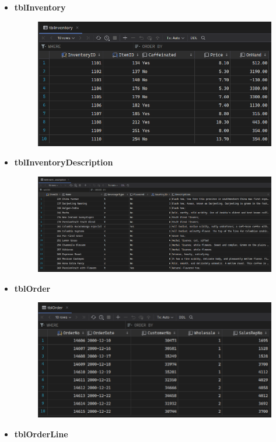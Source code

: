 \documentclass[12pt,titlepage]{article}
\begin{document}
\begin{itemize}
{\begin{figure}[h]
        \end{figure}
    }
    \item {
        \textbf{tblInventory}
        \begin{figure}[h]
            \centering
            \includegraphics[width=.7\textwidth]{./images/tblInventory.png}
        \end{figure}
    }
    \pagebreak
    \item {
        \textbf{tblInventoryDescription}
        \begin{figure}[h]
            \centering
            \includegraphics[width=.7\textwidth]{./images/tblInventoryDescription.png}
        \end{figure}
    }
    \item {
        \textbf{tblOrder}
        \begin{figure}[h]
            \centering
            \includegraphics[width=.7\textwidth]{./images/tblOrder.png}
        \end{figure}
    }
    \pagebreak
    \item {
        \textbf{tblOrderLine}
        \begin{figure}[h]
            \centering

\end{figure}}
\end{itemize}
\end{document}
